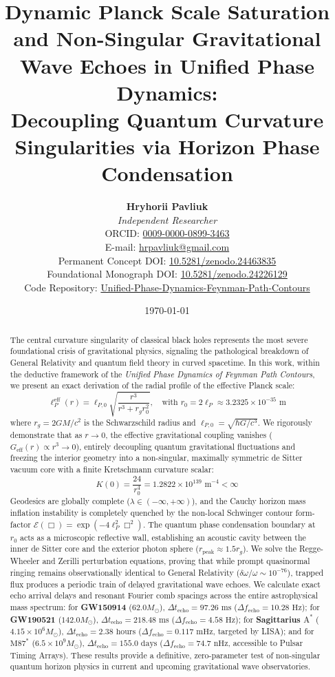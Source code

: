 \documentclass[11pt,a4paper]{article}
\title{\textbf{Dynamic Planck Scale Saturation and Non-Singular Gravitational Wave Echoes in Unified Phase Dynamics:\\
Decoupling Quantum Curvature Singularities via Horizon Phase Condensation}}
\author{\textbf{Hryhorii Pavliuk} \\
\textit{Independent Researcher} \\
ORCID: \href{https://orcid.org/0009-0000-0899-3463}{0009-0000-0899-3463} \\
E-mail: \href{mailto:hrpavliuk@gmail.com}{hrpavliuk@gmail.com} \\
Permanent Concept DOI: \href{https://doi.org/10.5281/zenodo.24463835}{10.5281/zenodo.24463835} \\
Foundational Monograph DOI: \href{https://doi.org/10.5281/zenodo.24226129}{10.5281/zenodo.24226129} \\
Code Repository: \href{https://github.com/hrpavliuk-byte/Unified-Phase-Dynamics-Feynman-Path-Contours}{Unified-Phase-Dynamics-Feynman-Path-Contours}}
\date{\today}
\begin{document}
\maketitle

\begin{abstract}
The central curvature singularity of classical black holes represents the most severe foundational crisis of gravitational physics, signaling the pathological breakdown of General Relativity and quantum field theory in curved spacetime. In this work, within the deductive framework of the \textit{Unified Phase Dynamics of Feynman Path Contours}, we present an exact derivation of the radial profile of the effective Planck scale:
\begin{equation}
\ell_P^{\mathrm{eff}}(r) = \ell_{P,0} \sqrt{\frac{r^3}{r^3 + r_g r_0^2}}, \quad \text{with } r_0 = 2\ell_P \approx 3.2325 \times 10^{-35}\text{ m}
\end{equation}
where $r_g = 2GM/c^2$ is the Schwarzschild radius and $\ell_{P,0} = \sqrt{\hbar G/c^3}$. We rigorously demonstrate that as $r \to 0$, the effective gravitational coupling vanishes ($G_{\mathrm{eff}}(r) \propto r^3 \to 0$), entirely decoupling quantum gravitational fluctuations and freezing the interior geometry into a non-singular, maximally symmetric de Sitter vacuum core with a finite Kretschmann curvature scalar:
\begin{equation}
K(0) = \frac{24}{r_0^4} = 1.2822 \times 10^{139}\text{ m}^{-4} < \infty
\end{equation}
Geodesics are globally complete ($\lambda \in (-\infty, +\infty)$), and the Cauchy horizon mass inflation instability is completely quenched by the non-local Schwinger contour form-factor $\mathcal{E}(\Box) = \exp(-4\ell_P^2 \Box^2)$. The quantum phase condensation boundary at $r_0$ acts as a microscopic reflective wall, establishing an acoustic cavity between the inner de Sitter core and the exterior photon sphere ($r_{\mathrm{peak}} \approx 1.5 r_g$). We solve the Regge-Wheeler and Zerilli perturbation equations, proving that while prompt quasinormal ringing remains observationally identical to General Relativity ($\delta \omega / \omega \sim 10^{-76}$), trapped flux produces a periodic train of delayed gravitational wave echoes. We calculate exact echo arrival delays and resonant Fourier comb spacings across the entire astrophysical mass spectrum: for \textbf{GW150914} ($62.0 M_\odot$), $\Delta t_{\mathrm{echo}} = 97.26\text{ ms}$ ($\Delta f_{\mathrm{echo}} = 10.28\text{ Hz}$); for \textbf{GW190521} ($142.0 M_\odot$), $\Delta t_{\mathrm{echo}} = 218.48\text{ ms}$ ($\Delta f_{\mathrm{echo}} = 4.58\text{ Hz}$); for \textbf{Sagittarius $\text{A}^*$} ($4.15 \times 10^6 M_\odot$), $\Delta t_{\mathrm{echo}} = 2.38\text{ hours}$ ($\Delta f_{\mathrm{echo}} = 0.117\text{ mHz}$, targeted by LISA); and for \textbf{$\text{M87}^*$} ($6.5 \times 10^9 M_\odot$), $\Delta t_{\mathrm{echo}} = 155.0\text{ days}$ ($\Delta f_{\mathrm{echo}} = 74.7\text{ nHz}$, accessible to Pulsar Timing Arrays). These results provide a definitive, zero-parameter test of non-singular quantum horizon physics in current and upcoming gravitational wave observatories.
\end{abstract}
\end{document}
